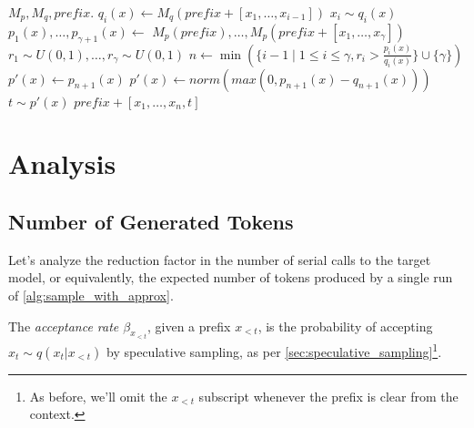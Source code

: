 \begin{algorithm}
  \caption{SpeculativeDecodingStep}
  \label{alg:sample_with_approx}
\begin{algorithmic}
   $M_p, M_q, prefix$.
    \STATE $q_i(x) \gets M_q(prefix + [x_1, \ldots, x_{i-1}])$
    \STATE $x_i \sim q_i(x)$
  \ENDFOR
  \STATE $p_1(x), \ldots, p_{\gamma + 1}(x) \gets$
  \STATE \quad \quad $M_p(prefix), \ldots, M_p(prefix + [x_1, \ldots, x_{\gamma}])$
  \STATE $r_1 \sim U(0, 1), \dots, r_\gamma \sim U(0, 1)$
  \STATE $n \gets \min(\{ i - 1 \mid 1 \le i \le \gamma, r_i > \frac{p_i(x)}{q_i(x)} \} \cup \{ \gamma \})$
  \STATE $p'(x) \gets p_{n+1}(x)$
    \STATE $p'(x) \gets norm(max(0, p_{n+1}(x) - q_{n+1}(x)))$
  \ENDIF
  \STATE $t \sim p'(x)$
   $prefix + [x_1, \ldots, x_{n}, t]$
\end{algorithmic}
\end{algorithm}

\section{Analysis}

\subsection{Number of Generated Tokens}
\label{sec:num_generated_tokens}
Let's analyze the reduction factor in the number of serial calls to the target model, or equivalently, the expected number of tokens produced by a single run of \ref{alg:sample_with_approx}.

\begin{definition}
\label{def:beta_prefix}
The \emph{acceptance rate $\beta_{x_{<t}}$}, given a prefix $x_{<t}$, is the probability of accepting $x_t \sim q(x_t|x_{<t})$ by speculative sampling, as per \ref{sec:speculative_sampling}\footnote{As before, we'll omit the $x_{<t}$ subscript whenever the prefix is clear from the context.}.
\end{definition}

